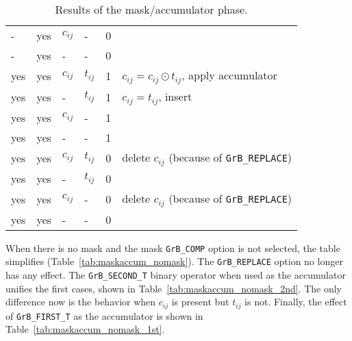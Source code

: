 \documentclass[12pt]{article}
\begin{document}
\begin{table}
{\begin{tabular}{lllll|l}
    -  &yes & $c_{ij}$ &  -        & 0    &   \\
    -  &yes &  -       &  -        & 0    &   \\
\hline
    yes&yes & $c_{ij}$ & $t_{ij}$  & 1    &  $c_{ij} = c_{ij} \odot t_{ij}$, apply accumulator \\
    yes&yes &  -       & $t_{ij}$  & 1    &  $c_{ij} = t_{ij}$, insert \\
    yes&yes & $c_{ij}$ &  -        & 1    &   \\
    yes&yes &  -       &  -        & 1    &   \\
    yes&yes & $c_{ij}$ & $t_{ij}$  & 0    &  delete $c_{ij}$  (because of \verb'GrB_REPLACE') \\
    yes&yes &  -       & $t_{ij}$  & 0    &   \\
    yes&yes & $c_{ij}$ &  -        & 0    &  delete $c_{ij}$  (because of \verb'GrB_REPLACE') \\
    yes&yes &  -       &  -        & 0    &   \\
\hline
\end{tabular}
}
\caption{Results of the mask/accumulator phase. \label{tab:maskaccum}}
\end{table}

When there is no mask and the mask \verb'GrB_COMP' option is not selected, the
table simplifies (Table~\ref{tab:maskaccum_nomask}).  The \verb'GrB_REPLACE'
option no longer has any effect.  The \verb'GrB_SECOND_T' binary operator when
used as the accumulator unifies the first cases, shown in
Table~\ref{tab:maskaccum_nomask_2nd}.  The only difference now is the behavior
when $c_{ij}$ is present but $t_{ij}$ is not.  Finally, the effect of
\verb'GrB_FIRST_T' as the accumulator is shown in
Table~\ref{tab:maskaccum_nomask_1st}.
\end{document}
